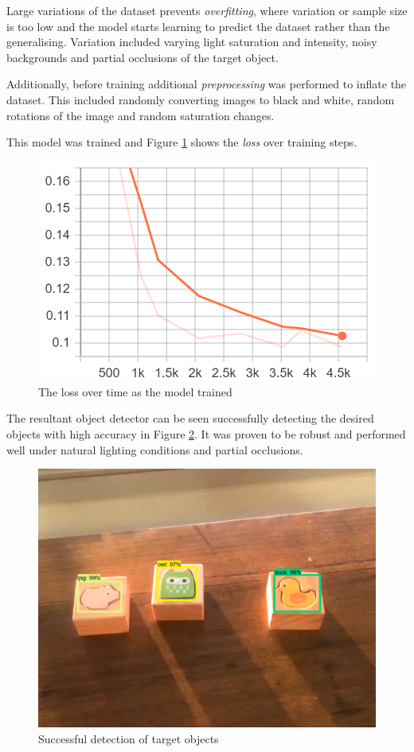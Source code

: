 \documentclass{UoNMCHA}
\numberwithin{equation}{section}
\begin{document}
Large variations of the dataset prevents \textit{overfitting}, where variation or sample size is too low and the model starts learning to predict the dataset rather than the generalising. 
Variation included varying light saturation and intensity, noisy backgrounds and partial occlusions of the target object.

Additionally, before training additional \textit{preprocessing} was performed to inflate the dataset. This included randomly converting images to black and white, random rotations of the image and random saturation changes. 

This model was trained and Figure \ref{tensorboard} shows the \textit{loss} over training steps. 

\begin{figure}[H]
	\begin{center}
		\includegraphics[width=.6\linewidth]{Figures/tensorboard}
		\caption{The loss over time as the model trained}
		\label{tensorboard}
	\end{center}
\end{figure}

The resultant object detector can be seen successfully detecting the desired objects with high accuracy in Figure \ref{detection}. It was proven to be robust and performed well under natural lighting conditions and partial occlusions.

\begin{figure}[H]
	\begin{center}
		\includegraphics[width=.6\linewidth]{Figures/detection}
		\caption{Successful detection of target objects}
		\label{detection}
	\end{center}
\end{figure}
\end{document}
